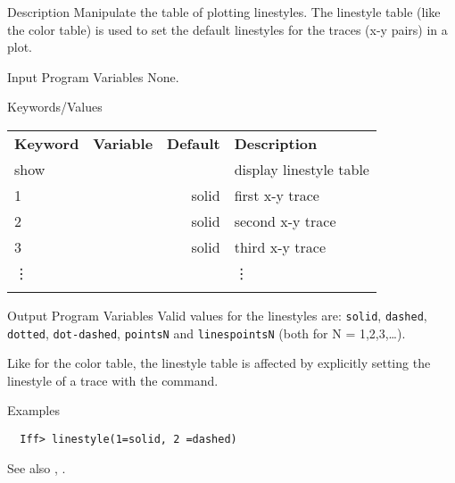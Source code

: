 \begin{IFFcom}
\item[Description] Manipulate the table of plotting linestyles.  The
  linestyle table (like the color table) is
  used to set the default linestyles for the traces (x-y pairs) in a plot.
\item[Input Program Variables] None.
\item[Keywords/Values]  
\begin{tabular}{llrl}
  \textbf{Keyword} & \textbf{Variable} & \textbf{Default} &
  \textbf{Description}\\
  \noalign{\smallskip}
  {show}    &  &        & display linestyle table\\
  1       &  & solid    & first x-y trace\\
  2       &  & solid    & second x-y trace\\
  3       &  & solid    & third x-y trace\\
  \vdots  &  &          & \vdots\\
  \noalign{\smallskip}
\end{tabular}

\item[Output Program Variables] Valid values for the linestyles are:
  {\tt{solid}}, {\tt{dashed}}, {\tt{dotted}}, {\tt{dot-dashed}},
  {\tt{pointsN}} and {\tt{linespointsN}} (both for N = 1,2,3,\ldots).

  Like for the color table, the linestyle table is affected by explicitly 
  setting the linestyle of a trace with the {} command.

\item[Examples] {\hspace{1.in} \vspace{-0.1truein} \relax }
\begin{verbatim} 
  Iff> linestyle(1=solid, 2 =dashed)
\end{verbatim} \noindent %
\item[See also] {}, {}.
\end{IFFcom}


